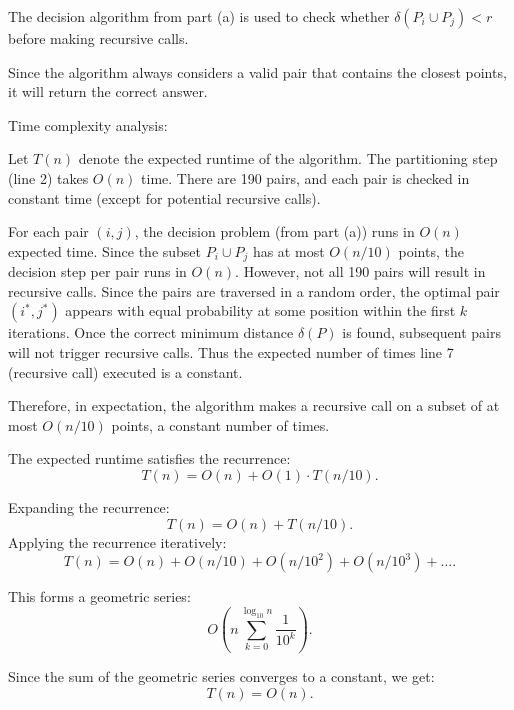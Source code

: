 \documentclass[11pt]{article}
\begin{document}
\begin{description}
\begin{enumerate}
  The decision algorithm from part (a) is used to check whether $\delta(P_i \cup P_j) < r$ 
  before making recursive calls.

  Since the algorithm always considers a valid pair that contains the closest points, 
  it will return the correct answer.

  Time complexity analysis:

  Let $T(n)$ denote the expected runtime of the algorithm.
  The partitioning step (line 2) takes $O(n)$ time.
  There are 190 pairs, and each pair is checked in constant time (except for potential recursive calls).

  For each pair $(i,j)$, the decision problem (from part (a)) runs in $O(n)$ expected time. Since the subset $P_i \cup P_j$ has at most $O(n/10)$ points, the decision step per pair runs in $O(n)$.
  However, not all 190 pairs will result in recursive calls.
  Since the pairs are traversed in a random order, the optimal pair $(i^*, j^*)$ appears with equal probability at some position within the first $k$ iterations. Once the correct minimum distance $\delta(P)$ is found, subsequent pairs will not trigger recursive calls. 
  Thus the expected number of times line 7 (recursive call) executed is a constant.

  Therefore, in expectation, the algorithm makes a recursive call on a subset of at most $O(n/10)$ points, a constant number of times.

  The expected runtime satisfies the recurrence:
  \[
  T(n) = O(n) + O(1) \cdot T(n/10).
  \]

  Expanding the recurrence:
  \[
  T(n) = O(n) + T(n/10).
  \]
  Applying the recurrence iteratively:
  \[
  T(n) = O(n) + O(n/10) + O(n/10^2) + O(n/10^3) + \dots.
  \]

  This forms a geometric series:
  \[
  O\left(n \sum_{k=0}^{\log_{10} n} \frac{1}{10^k} \right).
  \]

  Since the sum of the geometric series converges to a constant, we get:
  \[
  T(n) = O(n).
  \]
\end{enumerate}


\end{description}
\end{document}
